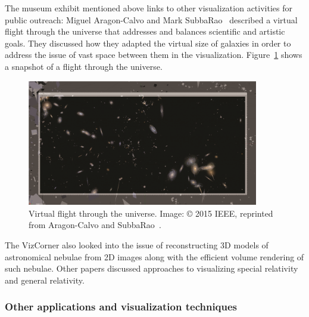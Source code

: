 \documentclass[10pt,journal,compsoc]{IEEEtran}
\begin{document}
The museum exhibit mentioned above links to other visualization activities for public outreach: 
Miguel Aragon-Calvo and Mark SubbaRao~\cite{Aragon-Calvo2015} described a virtual flight through the universe that addresses and balances scientific and artistic goals. They discussed how they adapted the virtual size of galaxies in order to address the issue of vast space between them in the visualization. Figure~\ref{fig:galaxies} shows a snapshot of a flight through the universe.

\begin{figure}
    \begin{center}    
        \includegraphics[width=0.9\textwidth]{galaxies.png}
        \caption{Virtual flight through the universe. 
 Image: \copyright{} 2015 IEEE, reprinted from Aragon-Calvo and SubbaRao~\cite{Aragon-Calvo2015}.
  \label{fig:galaxies}}        
    \end{center}
\end{figure}

The VizCorner also looked into the issue of reconstructing 3D models of astronomical nebulae from 2D images along with the efficient volume rendering of such nebulae. Other papers discussed approaches to visualizing special relativity and general relativity. 


\subsubsection*{Other applications and visualization techniques}
\end{document}
